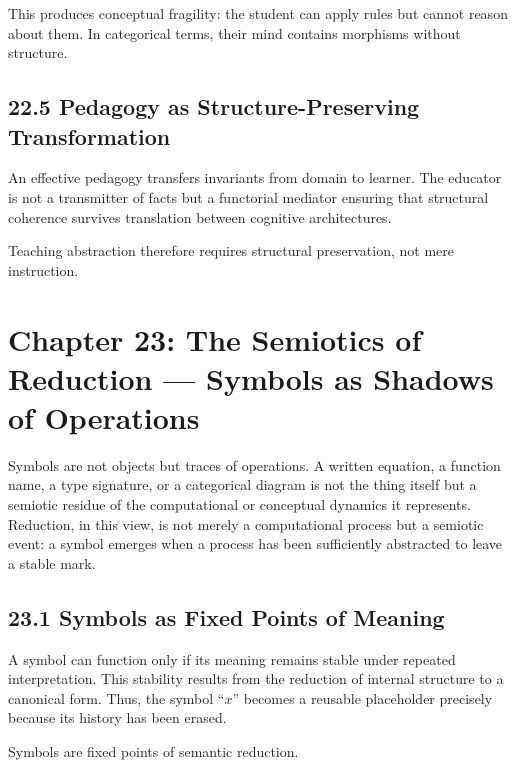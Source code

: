 \documentclass[12pt,letterpaper]{article}
\theoremstyle{remark}
\begin{document}
This produces conceptual fragility: the student can apply rules but cannot reason about them. In categorical terms, their mind contains morphisms without structure.

\subsection{22.5 Pedagogy as Structure-Preserving Transformation}

An effective pedagogy transfers invariants from domain to learner. The educator is not a transmitter of facts but a functorial mediator ensuring that structural coherence survives translation between cognitive architectures.

Teaching abstraction therefore requires structural preservation, not mere instruction.

\newpage

\section{Chapter 23: The Semiotics of Reduction — Symbols as Shadows of Operations}

Symbols are not objects but traces of operations. A written equation, a function name, a type signature, or a categorical diagram is not the thing itself but a semiotic residue of the computational or conceptual dynamics it represents. Reduction, in this view, is not merely a computational process but a semiotic event: a symbol emerges when a process has been sufficiently abstracted to leave a stable mark.

\subsection{23.1 Symbols as Fixed Points of Meaning}

A symbol can function only if its meaning remains stable under repeated interpretation. This stability results from the reduction of internal structure to a canonical form. Thus, the symbol ``\(x\)'' becomes a reusable placeholder precisely because its history has been erased.

Symbols are fixed points of semantic reduction.
\end{document}
